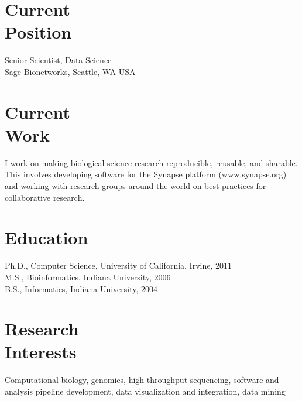 \documentclass[margin,line]{res}
\begin{document}
\address{\textbf{E-mail:} kenny@kennydaily.net \textbf{Web:} www.kennydaily.net}
\address{810 Taylor Ave N Apt 328, Seattle, WA 98109}

\begin{resume}


\section{\sc Current\\Position}
Senior Scientist, Data Science\\
Sage Bionetworks, Seattle, WA USA

\section{\sc Current\\Work}
I work on making biological science research reproducible, reusable, and sharable. This involves developing software for the Synapse platform (www.synapse.org) and working with research groups around the
world on best practices for collaborative research.

\section{\sc Education}
Ph.D., Computer Science, University of California, Irvine, 2011\\%
M.S., Bioinformatics, Indiana University, 2006\\%
B.S., Informatics, Indiana University, 2004%

\section{\sc Research\\Interests}
Computational biology, genomics, high throughput sequencing, software and analysis pipeline development, data visualization and integration, data mining


\end{resume}
\end{document}
